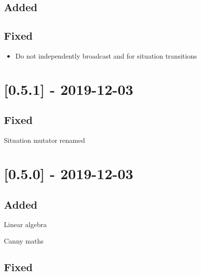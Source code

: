 \subsection{Added}

\begin{shortlist}
    \item {}
\end{shortlist}

\subsection{Fixed}

\begin{itemize}
    \item Do not independently broadcast  and  for situation transitions
\end{itemize}

\section{[0.5.1] - 2019-12-03}

\subsection{Fixed}

\begin{shortlist}
    \item Situation mutator renamed 
\end{shortlist}

\section{[0.5.0] - 2019-12-03}

\subsection{Added}

\begin{shortlist}
    \item Linear algebra
    \item Canny maths
\end{shortlist}

\subsection{Fixed}

